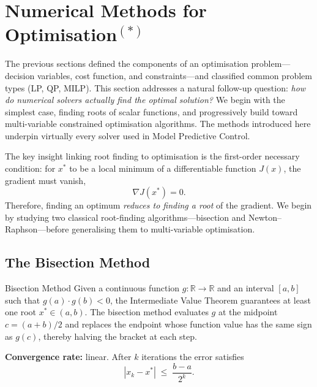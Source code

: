 
\section{Numerical Methods for Optimisation\texorpdfstring{$^{(*)}$}{(*)}}
\label{sec:numerical_methods}

The previous sections defined the components of an optimisation problem---decision variables, cost function, and constraints---and classified common problem types (LP, QP, MILP). This section addresses a natural follow-up question: \emph{how do numerical solvers actually find the optimal solution?} We begin with the simplest case, finding roots of scalar functions, and progressively build toward multi-variable constrained optimisation algorithms. The methods introduced here underpin virtually every solver used in Model Predictive Control.

The key insight linking root finding to optimisation is the first-order necessary condition: for $x^*$ to be a local minimum of a differentiable function $J(x)$, the gradient must vanish,
\[
\nabla J(x^*) = 0.
\]
Therefore, finding an optimum \emph{reduces to finding a root} of the gradient. We begin by studying two classical root-finding algorithms---bisection and Newton--Raphson---before generalising them to multi-variable optimisation.

\subsection{The Bisection Method}

\begin{defnbox}{Bisection Method}
	Given a continuous function $g\colon \mathbb{R}\to\mathbb{R}$ and an interval $[a,b]$ such that $g(a)\cdot g(b)<0$, the Intermediate Value Theorem guarantees at least one root $x^*\in(a,b)$. The bisection method evaluates $g$ at the midpoint $c=(a+b)/2$ and replaces the endpoint whose function value has the same sign as $g(c)$, thereby halving the bracket at each step.

	\textbf{Convergence rate:} linear. After $k$ iterations the error satisfies
	\[
	|x_k - x^*| \;\le\; \frac{b-a}{2^{k}}.
	\]
\end{defnbox}

